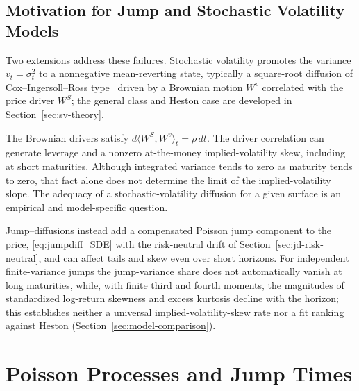 \subsection{Motivation for Jump and Stochastic Volatility Models}
Two extensions address these failures. Stochastic volatility promotes the
variance $v_t=\sigma_t^2$ to a nonnegative mean-reverting state, typically a
square-root diffusion of Cox--Ingersoll--Ross type~\cite{CoxIngersollRoss1985}
driven by a Brownian motion $W^v$ correlated with the price driver $W^S$;
the general class and Heston case are developed in Section~\ref{sec:sv-theory}.

The Brownian drivers satisfy $d\langle W^S,W^v\rangle_t=\rho\,dt$.
The driver correlation can generate leverage and a nonzero
at-the-money implied-volatility skew, including at short maturities.
Although integrated variance tends to zero as maturity tends to zero,
that fact alone does not determine the limit of the implied-volatility
slope. The adequacy of a stochastic-volatility diffusion for a given
surface is an empirical and model-specific question.

Jump--diffusions instead add a compensated Poisson jump component to the price,
\eqref{eq:jumpdiff_SDE} with the risk-neutral drift of
Section~\ref{sec:jd-risk-neutral}, and can affect tails and skew even over short
horizons. For independent finite-variance jumps the jump-variance share does not
automatically vanish at long maturities, while, with finite third and fourth
moments, the magnitudes of standardized log-return skewness and excess kurtosis
decline with the horizon; this establishes neither a universal
implied-volatility-skew rate nor a fit ranking against Heston
(Section~\ref{sec:model-comparison}).




\section{Poisson Processes and Jump Times}
